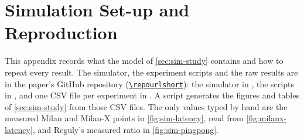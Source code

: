 \clearpage
\section{Simulation Set-up and Reproduction}
\label{app:sim-setup}

This appendix records what the model of \cref{sec:sim-study} contains and how to repeat every result. The simulator, the experiment scripts and the raw results are in the paper's GitHub repository (\href{\repourl}{\nolinkurl{\repourlshort}}): the simulator in , the scripts in , and one CSV file per experiment in . A script generates the figures and tables of \cref{sec:sim-study} from those CSV files. The only values typed by hand are the measured Milan and Milan-X points in \cref{fig:sim-latency}, read from \cref{fig:milanx-latency}, and Reguly's measured ratio in \cref{fig:sim-pingpong}.

